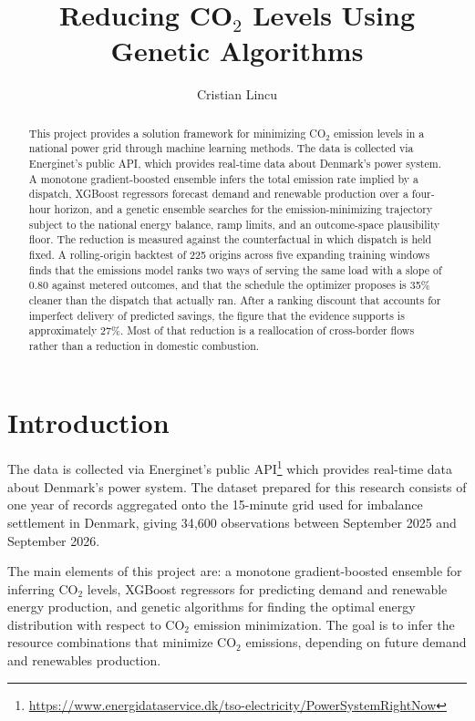 \documentclass[11pt]{article}
\title{\vspace{-1.5cm}\textbf{Reducing CO$_2$ Levels Using Genetic Algorithms}}
\author{Cristian Lincu}
\date{}
\begin{document}
\maketitle
\vspace{-1cm}

\begin{abstract}
\noindent
This project provides a solution framework for minimizing CO$_2$ emission
levels in a national power grid through machine learning methods. The data is
collected via Energinet's public API, which provides real-time data about
Denmark's power system. A monotone gradient-boosted ensemble infers the
total emission rate implied by a dispatch, XGBoost regressors forecast demand
and renewable production over a four-hour horizon, and a genetic ensemble
searches for the emission-minimizing trajectory subject to the national
energy balance, ramp limits, and an outcome-space plausibility floor. The
reduction is measured against the counterfactual in which dispatch is held
fixed. A rolling-origin backtest of 225 origins across five expanding
training windows finds that the emissions model ranks two ways of serving
the same load with a slope of 0.80 against metered outcomes, and that the
schedule the optimizer proposes is 35\% cleaner than the dispatch that
actually ran. After a ranking discount that accounts for imperfect delivery
of predicted savings, the figure that the evidence supports is
approximately 27\%. Most of that reduction is a reallocation of
cross-border flows rather than a reduction in domestic combustion.
\end{abstract}

\section{Introduction}

The data is collected via Energinet's public
API\footnote{\url{https://www.energidataservice.dk/tso-electricity/PowerSystemRightNow}}
which provides real-time data about Denmark's power system. The dataset
prepared for this research consists of one year of records aggregated onto the
15-minute grid used for imbalance settlement in Denmark, giving 34{,}600
observations between September 2025 and September 2026.

The main elements of this project are: a monotone gradient-boosted ensemble
for inferring CO$_2$ levels, XGBoost regressors for predicting demand and
renewable energy production, and genetic algorithms for finding the optimal
energy distribution with respect to CO$_2$ emission minimization. The goal
is to infer the resource combinations that minimize CO$_2$ emissions,
depending on future demand and renewables production.
\end{document}
